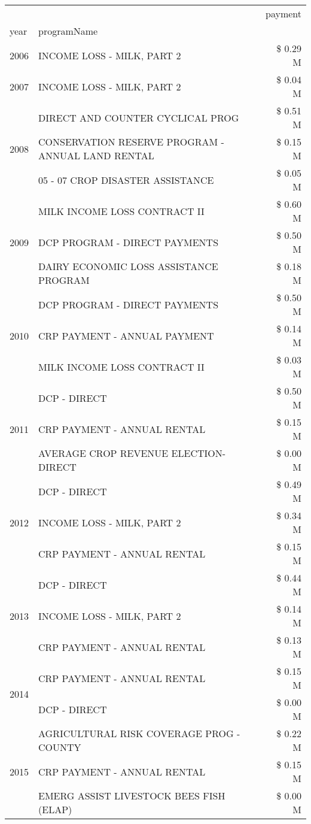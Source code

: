 \begin{tabular}{llr}
\toprule
 &  & payment \\
year & programName &  \\
\midrule
2006 & INCOME LOSS - MILK, PART 2 & \$ 0.29 M \\
\cline{1-3}
2007 & INCOME LOSS - MILK, PART 2 & \$ 0.04 M \\
\cline{1-3}
\multirow[t]{3}{*}{2008} & DIRECT AND COUNTER CYCLICAL PROG & \$ 0.51 M \\
 & CONSERVATION RESERVE PROGRAM - ANNUAL LAND RENTAL & \$ 0.15 M \\
 & 05 - 07 CROP DISASTER ASSISTANCE & \$ 0.05 M \\
\cline{1-3}
\multirow[t]{3}{*}{2009} & MILK INCOME LOSS CONTRACT II & \$ 0.60 M \\
 & DCP PROGRAM - DIRECT PAYMENTS & \$ 0.50 M \\
 & DAIRY ECONOMIC LOSS ASSISTANCE PROGRAM & \$ 0.18 M \\
\cline{1-3}
\multirow[t]{3}{*}{2010} & DCP PROGRAM - DIRECT PAYMENTS & \$ 0.50 M \\
 & CRP PAYMENT - ANNUAL PAYMENT & \$ 0.14 M \\
 & MILK INCOME LOSS CONTRACT II & \$ 0.03 M \\
\cline{1-3}
\multirow[t]{3}{*}{2011} & DCP - DIRECT & \$ 0.50 M \\
 & CRP PAYMENT - ANNUAL RENTAL & \$ 0.15 M \\
 & AVERAGE CROP REVENUE ELECTION-DIRECT & \$ 0.00 M \\
\cline{1-3}
\multirow[t]{3}{*}{2012} & DCP - DIRECT & \$ 0.49 M \\
 & INCOME LOSS - MILK, PART 2 & \$ 0.34 M \\
 & CRP PAYMENT - ANNUAL RENTAL & \$ 0.15 M \\
\cline{1-3}
\multirow[t]{3}{*}{2013} & DCP - DIRECT & \$ 0.44 M \\
 & INCOME LOSS - MILK, PART 2 & \$ 0.14 M \\
 & CRP PAYMENT - ANNUAL RENTAL & \$ 0.13 M \\
\cline{1-3}
\multirow[t]{2}{*}{2014} & CRP PAYMENT - ANNUAL RENTAL & \$ 0.15 M \\
 & DCP - DIRECT & \$ 0.00 M \\
\cline{1-3}
\multirow[t]{3}{*}{2015} & AGRICULTURAL RISK COVERAGE PROG - COUNTY & \$ 0.22 M \\
 & CRP PAYMENT - ANNUAL RENTAL & \$ 0.15 M \\
 & EMERG ASSIST LIVESTOCK BEES FISH (ELAP) & \$ 0.00 M \\

\end{tabular}
